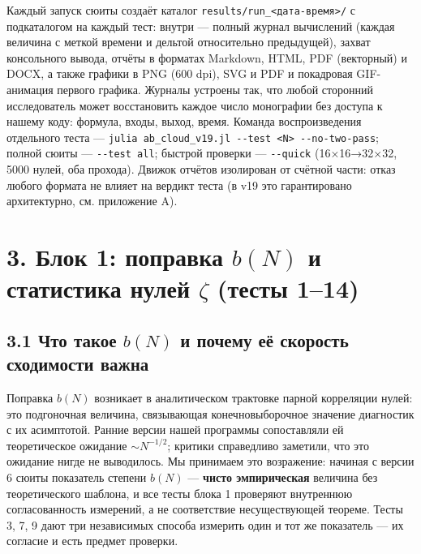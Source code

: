 \documentclass[
]{article}
\begin{document}
Каждый запуск сюиты создаёт каталог
\texttt{results/run\_\textless{}дата-время\textgreater{}/} с
подкаталогом на каждый тест: внутри --- полный журнал вычислений (каждая
величина с меткой времени и дельтой относительно предыдущей), захват
консольного вывода, отчёты в форматах Markdown, HTML, PDF (векторный) и
DOCX, а также графики в PNG (600 dpi), SVG и PDF и покадровая
GIF-анимация первого графика. Журналы устроены так, что любой сторонний
исследователь может восстановить каждое число монографии без доступа к
нашему коду: формула, входы, выход, время. Команда воспроизведения
отдельного теста ---
\texttt{julia\ ab\_cloud\_v19.jl\ -\/-test\ \textless{}N\textgreater{}\ -\/-no-two-pass};
полной сюиты --- \texttt{-\/-test\ all}; быстрой проверки ---
\texttt{-\/-quick} (16×16→32×32, 5000 нулей, оба прохода). Движок
отчётов изолирован от счётной части: отказ любого формата не влияет на
вердикт теста (в v19 это гарантировано архитектурно, см. приложение A).

\section{\texorpdfstring{3. Блок 1: поправка \(b(N)\) и статистика нулей
\(\zeta\) (тесты
1--14)}{3. Блок 1: поправка b(N) и статистика нулей \textbackslash zeta (тесты 1--14)}}\label{ux431ux43bux43eux43a-1-ux43fux43eux43fux440ux430ux432ux43aux430-bn-ux438-ux441ux442ux430ux442ux438ux441ux442ux438ux43aux430-ux43dux443ux43bux435ux439-zeta-ux442ux435ux441ux442ux44b-114}

\subsection{\texorpdfstring{3.1 Что такое \(b(N)\) и почему её скорость
сходимости
важна}{3.1 Что такое b(N) и почему её скорость сходимости важна}}\label{ux447ux442ux43e-ux442ux430ux43aux43eux435-bn-ux438-ux43fux43eux447ux435ux43cux443-ux435ux451-ux441ux43aux43eux440ux43eux441ux442ux44c-ux441ux445ux43eux434ux438ux43cux43eux441ux442ux438-ux432ux430ux436ux43dux430}

Поправка \(b(N)\) возникает в аналитическом трактовке парной корреляции
нулей: это подгоночная величина, связывающая конечновыборочное значение
диагностик с их асимптотой. Ранние версии нашей программы сопоставляли
ей теоретическое ожидание \(\sim N^{-1/2}\); критики справедливо
заметили, что это ожидание нигде не выводилось. Мы принимаем это
возражение: начиная с версии 6 сюиты показатель степени \(b(N)\) ---
\textbf{чисто эмпирическая} величина без теоретического шаблона, и все
тесты блока 1 проверяют внутреннюю согласованность измерений, а не
соответствие несуществующей теореме. Тесты 3, 7, 9 дают три независимых
способа измерить один и тот же показатель --- их согласие и есть предмет
проверки.
\end{document}
